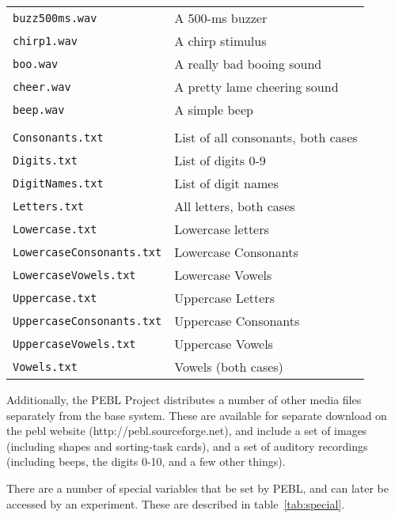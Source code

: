 \begin{longtable}{ll}
\texttt{buzz500ms.wav}   &A 500-ms buzzer\\
\texttt{chirp1.wav}      &A chirp stimulus\\
\texttt{boo.wav}         &A really bad booing sound\\
\texttt{cheer.wav}       &A pretty lame cheering sound\\
\texttt{beep.wav}        &A simple beep\\
\addlinespace[.1cm]
\midrule
\addlinespace[.2cm]
\multicolumn{2}{l}{\textbf{In `media/text/'}:}\\
\addlinespace[.2cm]
\texttt{Consonants.txt}  &List of all consonants, both cases\\
\texttt{Digits.txt}               &List of digits 0-9\\
\texttt{DigitNames.txt}           &List of digit names\\
\texttt{Letters.txt}              &All letters, both cases\\
\texttt{Lowercase.txt}            &Lowercase letters\\
\texttt{LowercaseConsonants.txt}  &Lowercase Consonants\\
\texttt{LowercaseVowels.txt}      &Lowercase Vowels\\
\texttt{Uppercase.txt}            &Uppercase Letters\\
\texttt{UppercaseConsonants.txt}  &Uppercase Consonants\\
\texttt{UppercaseVowels.txt}      &Uppercase Vowels\\
\texttt{Vowels.txt}               &Vowels (both cases)\\

\end{longtable}

Additionally, the PEBL Project distributes a number of other media
files separately from the base system.  These are available for separate
download on the pebl website (http://pebl.sourceforge.net), and
include a set of images (including shapes and sorting-task cards), and
a set of auditory recordings (including beeps, the digits 0-10, and a
few other things).

\vspace{1cm}



There are a number of special variables that be set by PEBL, 
and can later be accessed by an experiment. These are described in table~\ref{tab:special}.

